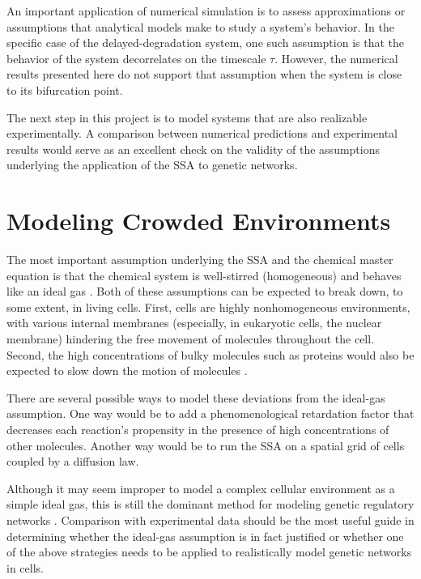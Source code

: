 \documentclass[english,letterpaper,12pt]{report}
\begin{document}
\begin{doublespacing}
An important application of numerical simulation is to assess approximations or assumptions that analytical models make to study a system's behavior. In the specific case of the delayed-degradation system, one such assumption is that the behavior of the system decorrelates on the timescale $\tau$. However, the numerical results presented here do not support that assumption when the system is close to its bifurcation point.

The next step in this project is to model systems that are also realizable experimentally. A comparison between numerical predictions and experimental results would serve as an excellent check on the validity of the assumptions underlying the application of the SSA to genetic networks.

\section{Modeling Crowded Environments} %
\label{sub:diffusion-crowded}

The most important assumption underlying the SSA and the chemical master equation is that the chemical system is well-stirred (homogeneous) and behaves like an ideal gas \cite{langevin-eqn}. Both of these assumptions can be expected to break down, to some extent, in living cells. First, cells are highly nonhomogeneous environments, with various internal membranes (especially, in eukaryotic cells, the nuclear membrane) hindering the free movement of molecules throughout the cell. Second, the high concentrations of bulky molecules such as proteins would also be expected to slow down the motion of molecules .

There are several possible ways to model these deviations from the ideal-gas assumption. One way would be to add a phenomenological retardation factor that decreases each reaction's propensity in the presence of high concentrations of other molecules. Another way would be to run the SSA on a spatial grid of cells coupled by a diffusion law.

Although it may seem improper to model a complex cellular environment as a simple ideal gas, this is still the dominant method for modeling genetic regulatory networks . Comparison with experimental data should be the most useful guide in determining whether the ideal-gas assumption is in fact justified or whether one of the above strategies needs to be applied to realistically model genetic networks in cells.


\end{doublespacing}
\end{document}
